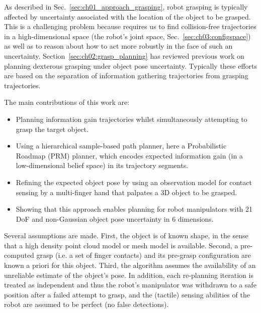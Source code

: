 As described in Sec.~\ref{sec:ch01_approach_grasping}, robot grasping is typically affected by uncertainty associated with the location of the object to be grasped.  
This is a challenging problem because requires us to find collision-free trajectories in a high-dimensional space (the robot's joint space, Sec.~\ref{sec:ch03:configspace}) as well as to reason about how to act more robustly in the face of such an uncertainty. Section~\ref{sec:ch02:grasp_planning} has reviewed previous work on planning dexterous grasping under object pose uncertainty. Typically these efforts are based on the separation of information gathering trajectories from grasping trajectories. 

The main contributions of this work are:
\begin{itemize}
\item Planning information gain trajectories whilst simultaneously attempting to grasp the target object.
\item Using a hierarchical sample-based path planner, here a Probabilistic Roadmap (PRM) planner, which encodes expected information gain (in a low-dimensional belief space) in its trajectory segments.
\item Refining the expected object pose by using an observation model for contact sensing by a multi-finger hand that palpates a 3D object to be grasped.
\item Showing that this approach enables planning for robot manipulators with 21 DoF and non-Gaussian object pose uncertainty in 6 dimensions.
\end{itemize}

Several assumptions are made. First, the object is of known shape, in the sense that a high density point cloud model or mesh model is available. Second, a pre-computed grasp (i.e. a set of finger contacts) and its pre-grasp configuration are known a priori for this object. Third, the algorithm assumes the availability of an unreliable estimate of the object's pose. In addition, each re-planning iteration is treated as independent and thus the robot's manipulator was withdrawn to a safe position after a failed attempt to grasp, and the (tactile) sensing abilities of the robot are assumed to be perfect (no false detections).

